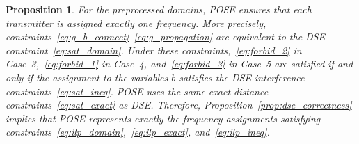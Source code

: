 \documentclass[letterpaper,journal]{IEEEtran}
\newtheorem{proposition}{Proposition}
\begin{document}
\begin{proposition}
\label{prop:pose_correctness}
For the preprocessed domains, POSE ensures that each transmitter is assigned exactly one frequency. More precisely, constraints~\eqref{eq:g_b_connect}--\eqref{eq:g_propagation} are equivalent to the DSE constraint~\eqref{eq:sat_domain}.
Under these constraints,~\eqref{eq:forbid_2} in Case~3,~\eqref{eq:forbid_1} in Case~4, and~\eqref{eq:forbid_3} in Case~5 are satisfied if and only if the assignment to the variables $b$ satisfies the DSE interference constraints~\eqref{eq:sat_ineq}. 
POSE uses the same exact-distance constraints~\eqref{eq:sat_exact} as DSE. 
Therefore, Proposition~\ref{prop:dse_correctness} implies that POSE represents exactly the frequency assignments satisfying constraints~\eqref{eq:ilp_domain},~\eqref{eq:ilp_exact}, and~\eqref{eq:ilp_ineq}.
\end{proposition}
\end{document}
